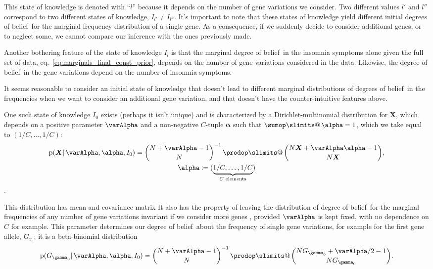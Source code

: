 \documentclass[\ifafour a4paper,12pt,\else a5paper,10pt,\fi%
onecolumn,oneside,article,%
british%
]{memoir}
\makeatletter
\theoremstyle{remark}
\theoremstyle{innote}
\def\sum{\DOTSI\sumop\slimits@}
\def\prod{\DOTSI\prodop\slimits@}
\newcommand*{\citep}{\parencites}
\newcommand*{\defd}{\coloneqq}
\newcommand*{\pf}{\mathrm{p}}%
\renewcommand*{\|}{\mathpunct{|}}
\newcommand*{\sect}{\S}%
\newcommand*{\sects}{\S\S}%
\newcommand*{\eqn}{eq.}%
\newcommand*{\tprod}{\mathop{\textstyle\prod}\nolimits}
\newcommand*{\tsum}{\mathop{\textstyle\sum}\nolimits}
\newcommand*{\E}{\mathrm{E}}
\DeclareMathOperator{\cov}{cov}
\DeclareMathOperator{\diag}{diag}
\newcommand*{\dob}{degree of belief}
\newcommand*{\dobs}{degrees of belief}
\newcommand*{\yI}{I}
\newcommand*{\ysum}{\tsum}
\newcommand*{\yprod}{\tprod}
\newcommand*{\yg}{\gamma}
\newcommand*{\gn}{l}
\newcommand*{\yF}{\bm{X}}
\newcommand*{\yIc}{I_{\gn}}
\newcommand*{\yIo}{I_{0}}
\newcommand*{\yA}{\varAlpha}
\newcommand*{\ya}{\bm{\alpha}}
\makeatother
\begin{document}
This state of knowledge is denoted with \enquote{$\gn$} because it depends
on the number of gene variations we consider. Two different values $\gn'$
and $\gn''$ correspond to two different states of knowledge,
$\yI_{\gn'} \ne \yI_{\gn''}$. It's important to note that these states of
knowledge yield different initial \dobs\ for the marginal frequency
distribution of a single gene. As a consequence, if we suddenly decide to
consider additional genes, or to neglect some, we cannot compare our
inference with the ones previously made.

Another bothering feature of the state of knowledge $\yIc$ is that the
marginal \dob\ in the insomnia symptoms alone given the full set of
data, \eqn~\eqref{eq:marginals_final_const_prior}, depends on the number of
gene variations considered in the data. Likewise, the \dob\ in the
gene variations depend on the number of insomnia symptoms.

It seems reasonable to consider an initial state of knowledge that doesn't
lead to different marginal distributions of \dobs\ in the frequencies when
we want to consider an additional gene variation, and that doesn't have
the counter-intuitive features above.

One such state of knowledge $\yIo$ exists (perhaps it isn't unique) and is
characterized by a Dirichlet-multinomial distribution for $\yF$, which
depends on a positive parameter $\yA$ and a non-negative $C$-tuple $\ya$
such that $\ysum\ya=1$, which we take equal to $(1/C,\dotsc,1/C)$:
\begin{multline}
  \label{eq:dirichlet_prior}
  \pf(\yF \| \yA, \ya,\yIo) =
  \binom{N+\yA-1}{N}^{-1} \yprod\binom{N\yF+\yA\ya-1}{N\yF},\\
  \ya \defd (\underbrace{1/C,\dotsc,1/C}_{\text{$C$ elements}})
\end{multline}
\citep[\sect~13.1]{johnsonetal1969_r1996}[\sect~3]{minka2000_r2012}[and
especially][\sects~3--4]{basuetal1982}.

This distribution has mean and covariance matrix
It also has the property of leaving the distribution of \dob\ for the
marginal frequencies of any number of gene variations invariant if we
consider more genes \citep[\sects~3--4]{basuetal1982}, provided $\yA$ is
kept fixed, with no dependence on $C$ for example. This parameter
determines our \dob\ about the frequency of single gene variations, for
example for the first gene allele, $G_{\yg_0}$: it is a beta-binomial
distribution
\begin{equation}
  \label{eq:dirichlet_prior_marginal_beta-binomial}
  \pf(G_{\yg_0} \| \yA, \ya,\yIo) =
  \binom{N+\yA-1}{N}^{-1} \yprod\binom{N G_{\yg_0}+\yA/2-1}{N G_{\yg_0}}.
\end{equation}
\end{document}
